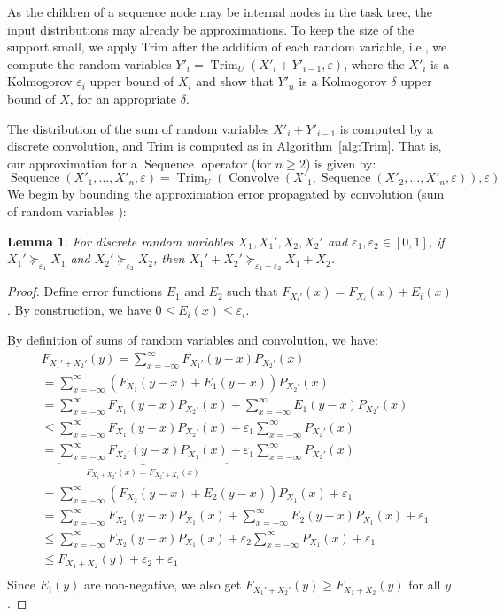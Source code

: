 \documentclass[review]{elsarticle}
\newtheorem{lemma}{Lemma}
\DeclareMathOperator{\Trim}{Trim}
\DeclareMathOperator{\Sequence}{Sequence}
\DeclareMathOperator{\Convolve}{Convolve}
\begin{document}
As the children of a sequence node may be internal nodes in the task tree,
the input distributions may already be approximations. To keep the size of
the support small, we apply Trim after the addition of each random variable, i.e., 
we compute the random variables 
$Y'_i = \Trim_U(X'_i + Y'_{i-1}, \varepsilon)$,
where the $X'_i$ is a Kolmogorov $\varepsilon_i $ upper bound of $X_i$
and show that $Y'_n$ is a Kolmogorov $\delta $ upper bound of $X$, for an appropriate $\delta $.

The distribution of the sum of random variables $X'_i + Y'_{i-1}$ is 
computed by a discrete convolution, and Trim is
computed as in Algorithm~\ref{alg:Trim}. That is, our approximation for a $\Sequence$ operator (for $n\geq 2$) is given by: 
\begin{equation}
\label{eq:sequence}
\Sequence(X'_1,\dots , X'_n,  \varepsilon) 
= \Trim_U(\Convolve(X'_1, \Sequence(X'_2, \dots , X'_n, \varepsilon)), \varepsilon)
\end{equation}
We begin by bounding the approximation error propagated by convolution (sum of random variables ):

\begin{lemma} \label{Convolv}
For discrete random variables  $X_1,X_1',X_2,X_2'$ and $\varepsilon_1,\varepsilon_2 \in [0,1]$, 
if $X_1'\succeq_{\varepsilon_1} X_1$ and  $X_2'\succeq_{\varepsilon_2} X_2$,
then $X_1'+X_2'\succeq_{\varepsilon_1+\varepsilon_2} X_1+X_2$.
\end{lemma}

\begin{proof}
Define error functions $E_1$ and $E_2$ such that 
$F_{X_i'}(x) = F_{X_i}(x)+ E_i(x)$. By construction, we have $ 0 \leq E_i(x) \leq \varepsilon_i$.

By definition of sums of random variables and convolution, we have:
\begin{align*}
& F_{X_1'+X_2'}(y) = \sum_{x=-\infty}^{\infty}F_{X_1'}(y-x)P_{X_2'}(x)\\
&=\sum_{x=-\infty}^{\infty}(F_{X_1}(y-x)+E_1(y-x))P_{X_2'}(x)\\
&= \sum_{x=-\infty}^{\infty}F_{X_1}(y-x)P_{X_2'}(x)+\sum_{x=-\infty}^{\infty}E_1(y-x)P_{X_2'}(x)\\
&\leq\sum_{x=-\infty}^{\infty}F_{X_1}(y-x)P_{X_2'}(x)+\varepsilon_1\sum_{x=-\infty}^{\infty}P_{X_2'}(x)\\
&=\underbrace{\sum_{x=-\infty}^{\infty}F_{X_2'}(y-x)P_{X_1}(x)}_{F_{X_1+X_2'}(x)=F_{X_2'+X_1}(x)}+\varepsilon_1\sum_{x=-\infty}^{\infty}P_{X_2'}(x)\\
&=\sum_{x=-\infty}^{\infty}(F_{X_2}(y-x)+E_2(y-x))P_{X_1}(x) + \varepsilon_1\\
&=\sum_{x=-\infty}^{\infty}F_{X_2}(y-x)P_{X_1}(x)+\sum_{x=-\infty}^{\infty}E_2(y-x)P_{X_1}(x) + \varepsilon_1\\
&\leq\sum_{x=-\infty}^{\infty}F_{X_2}(y-x)P_{X_1}(x)+\varepsilon_2\sum_{x=-\infty}^{\infty}P_{X_1}(x) + \varepsilon_1\\
&\leq F_{X_1+X_2}(y)+\varepsilon_2 + \varepsilon_1\\
\end{align*}%
Since $E_i(y)$ are non-negative, we also get $F_{X_1'+X_2'}(y) \geq F_{X_1+X_2}(y)$ for all $y$.
\end{proof}
\end{document}
